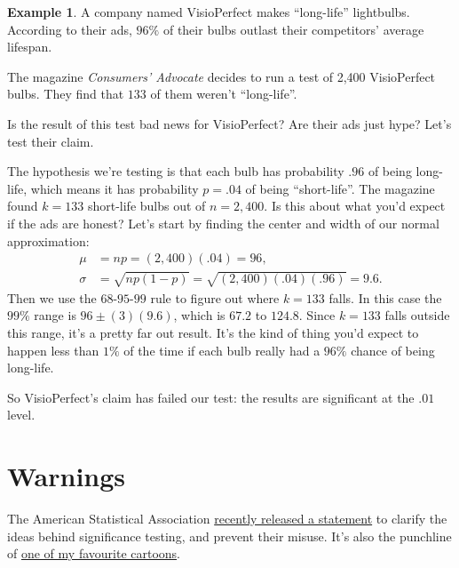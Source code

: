 \documentclass[justified]{tufte-book}
\theoremstyle{definition}
\theoremstyle{definition}
\newtheorem{example}{Example}[chapter]
\theoremstyle{definition}
\theoremstyle{remark}
\begin{document}
\begin{example}
A company named VisioPerfect makes ``long-life'' lightbulbs. According
to their ads, \(96\%\) of their bulbs outlast their competitors' average
lifespan.

The magazine \emph{Consumers' Advocate} decides to run a test of 2,400
VisioPerfect bulbs. They find that \(133\) of them weren't
``long-life''.\\
\end{example}

Is the result of this test bad news for VisioPerfect? Are their ads just hype? Let's test their claim.

The hypothesis we're testing is that each bulb has probability \(.96\) of being long-life, which means it has probability \(p = .04\) of being ``short-life''. The magazine found \(k = 133\) short-life bulbs out of \(n = 2,400\). Is this about what you'd expect if the ads are honest? Let's start by finding the center and width of our normal approximation:
\[
  \begin{aligned}
    \mu &= np = (2,400)(.04) = 96,\\
    \sigma &= \sqrt{np(1-p)} = \sqrt{(2,400)(.04)(.96)} = 9.6.
  \end{aligned}
\]
Then we use the \(68\)-\(95\)-\(99\) rule to figure out where \(k = 133\) falls. In this case the \(99\%\) range is \(96 \pm (3)(9.6)\), which is \(67.2\) to \(124.8\). Since \(k = 133\) falls outside this range, it's a pretty far out result. It's the kind of thing you'd expect to happen less than \(1\%\) of the time if each bulb really had a \(96\%\) chance of being long-life.

So VisioPerfect's claim has failed our test: the results are significant at the \(.01\) level.

\hypertarget{warnings}{%
\section{Warnings}\label{warnings}}

\begin{marginfigure}
The American Statistical Association
\href{https://www.amstat.org/newsroom/pressreleases/P-ValueStatement.pdf}{recently
released a statement} to clarify the ideas behind significance testing,
and prevent their misuse. It's also the punchline of
\href{https://imgs.xkcd.com/comics/significant.png}{one of my favourite
cartoons}.
\end{marginfigure}
\end{document}
